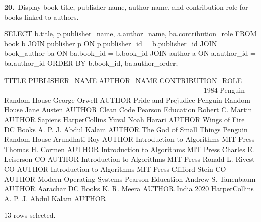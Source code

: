 \noindent\begin{minipage}{\linewidth}
\begingroup{}
{\fontsize{14}{17}\selectfont\textbf{20.}}\ Display book title, publisher name, author name, and contribution role for books linked to authors.\par
\endgroup\vspace{12pt}


\begin{sqlcode}
SELECT b.title, p.publisher_name, a.author_name,
       ba.contribution_role
FROM book b
JOIN publisher p ON p.publisher_id = b.publisher_id
JOIN book_author ba ON ba.book_id = b.book_id
JOIN author a ON a.author_id = ba.author_id
ORDER BY b.book_id, ba.author_order;
\end{sqlcode}

\vspace{18pt}


\begin{sqlout}[fontsize=\footnotesize]
TITLE                       PUBLISHER_NAME        AUTHOR_NAME           CONTRIBUTION_ROLE
--------------------------  --------------------  --------------------  -----------------
1984                        Penguin Random House  George Orwell         AUTHOR
Pride and Prejudice         Penguin Random House  Jane Austen           AUTHOR
Clean Code                  Pearson Education     Robert C. Martin      AUTHOR
Sapiens                     HarperCollins         Yuval Noah Harari     AUTHOR
Wings of Fire               DC Books              A. P. J. Abdul Kalam  AUTHOR
The God of Small Things     Penguin Random House  Arundhati Roy         AUTHOR
Introduction to Algorithms  MIT Press             Thomas H. Cormen      AUTHOR
Introduction to Algorithms  MIT Press             Charles E. Leiserson  CO-AUTHOR
Introduction to Algorithms  MIT Press             Ronald L. Rivest      CO-AUTHOR
Introduction to Algorithms  MIT Press             Clifford Stein        CO-AUTHOR
Modern Operating Systems    Pearson Education     Andrew S. Tanenbaum   AUTHOR
Aarachar                    DC Books              K. R. Meera           AUTHOR
India 2020                  HarperCollins         A. P. J. Abdul Kalam  AUTHOR

13 rows selected.
\end{sqlout}
\end{minipage}\par\vspace{24pt}

